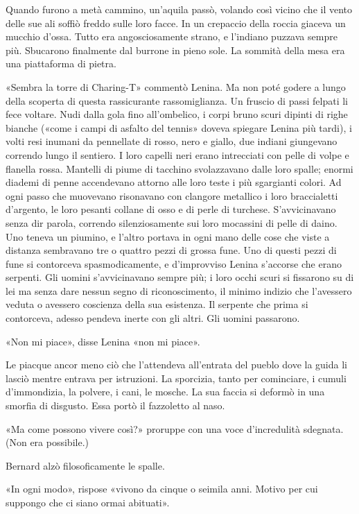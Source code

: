 \documentclass[
a5paper, %
10pt, %
twoside, 
onecolumn, %
openany, %
]{memoir}
\begin{document}
Quando furono a metà cammino, un’aquila passò, volando così vicino che il vento delle sue ali soffiò freddo sulle loro facce. In un crepaccio della roccia giaceva un mucchio d’ossa. Tutto era angosciosamente strano, e l’indiano puzzava sempre più. Sbucarono finalmente dal burrone in pieno sole. La sommità della mesa era una piattaforma di pietra.

«Sembra la torre di Charing-T» commentò Lenina. Ma non poté godere a lungo della scoperta di questa rassicurante rassomiglianza. Un fruscio di passi felpati li fece voltare. Nudi dalla gola fino all’ombelico, i corpi bruno scuri dipinti di righe bianche («come i campi di asfalto del tennis» doveva spiegare Lenina più tardi), i volti resi inumani da pennellate di rosso, nero e giallo, due indiani giungevano correndo lungo il sentiero. I loro capelli neri erano intrecciati con pelle di volpe e flanella rossa. Mantelli di piume di tacchino svolazzavano dalle loro spalle; enormi diademi di penne accendevano attorno alle loro teste i più sgargianti colori. Ad ogni passo che muovevano risonavano con clangore metallico i loro braccialetti d’argento, le loro pesanti collane di osso e di perle di turchese. S’avvicinavano senza dir parola, correndo silenziosamente sui loro mocassini di pelle di daino. Uno teneva un piumino, e l’altro portava in ogni mano delle cose che viste a distanza sembravano tre o quattro pezzi di grossa fune. Uno di questi pezzi di fune si contorceva spasmodicamente, e d’improvviso Lenina s’accorse che erano serpenti. Gli uomini s’avvicinavano sempre più; i loro occhi scuri si fissarono su di lei ma senza dare nessun segno di riconoscimento, il minimo indizio che l’avessero veduta o avessero coscienza della sua esistenza. Il serpente che prima si contorceva, adesso pendeva inerte con gli altri. Gli uomini passarono.

«Non mi piace», disse Lenina «non mi piace».

Le piacque ancor meno ciò che l’attendeva all’entrata del pueblo dove la guida li lasciò mentre entrava per istruzioni. La sporcizia, tanto per cominciare, i cumuli d’immondizia, la polvere, i cani, le mosche. La sua faccia si deformò in una smorfia di disgusto. Essa portò il fazzoletto al naso.

«Ma come possono vivere così?» proruppe con una voce d’incredulità sdegnata. (Non era possibile.)

Bernard alzò filosoficamente le spalle.

«In ogni modo», rispose «vivono da cinque o seimila anni. Motivo per cui suppongo che ci siano ormai abituati».
\end{document}
